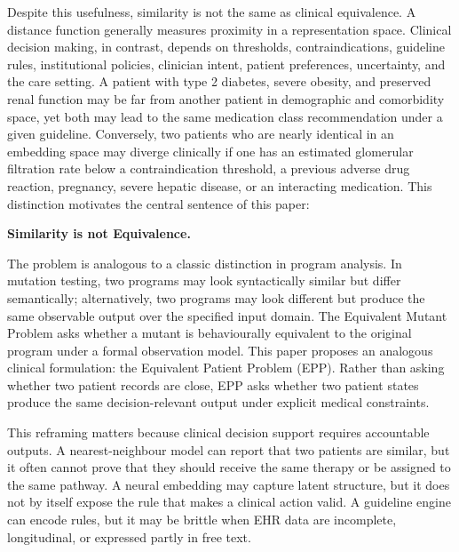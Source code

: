 \documentclass[english,5p,twocolumn,preprint]{elsarticle}
\begin{document}
Despite this usefulness, similarity is not the same as clinical equivalence. A distance function generally measures proximity in a representation space. Clinical decision making, in contrast, depends on thresholds, contraindications, guideline rules, institutional policies, clinician intent, patient preferences, uncertainty, and the care setting. A patient with type 2 diabetes, severe obesity, and preserved renal function may be far from another patient in demographic and comorbidity space, yet both may lead to the same medication class recommendation under a given guideline. Conversely, two patients who are nearly identical in an embedding space may diverge clinically if one has an estimated glomerular filtration rate below a contraindication threshold, a previous adverse drug reaction, pregnancy, severe hepatic disease, or an interacting medication. This distinction motivates the central sentence of this paper:

\begin{tcolorbox}[colback=gray!5,colframe=black,title=Core claim]
\centering
\textbf{Similarity is not Equivalence.}
\end{tcolorbox}

The problem is analogous to a classic distinction in program analysis. In mutation testing, two programs may look syntactically similar but differ semantically; alternatively, two programs may look different but produce the same observable output over the specified input domain. The Equivalent Mutant Problem asks whether a mutant is behaviourally equivalent to the original program under a formal observation model. This paper proposes an analogous clinical formulation: the Equivalent Patient Problem (EPP). Rather than asking whether two patient records are close, EPP asks whether two patient states produce the same decision-relevant output under explicit medical constraints.

This reframing matters because clinical decision support requires accountable outputs. A nearest-neighbour model can report that two patients are similar, but it often cannot prove that they should receive the same therapy or be assigned to the same pathway. A neural embedding may capture latent structure, but it does not by itself expose the rule that makes a clinical action valid. A guideline engine can encode rules, but it may be brittle when EHR data are incomplete, longitudinal, or expressed partly in free text.
\end{document}
